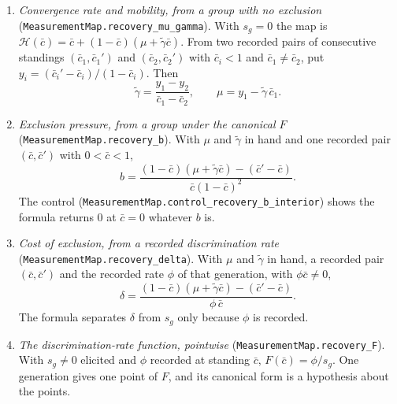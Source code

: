 \documentclass[11pt]{article}
\newcommand{\lean}[1]{\texttt{\footnotesize #1}}
\begin{document}
\begin{enumerate}
\item \emph{Convergence rate and mobility, from a group with no exclusion}
  (\lean{MeasurementMap.recovery\_mu\_gamma}). With $s_g=0$ the map is
  $\mathcal{H}(\bar c)=\bar c+(1-\bar c)(\mu+\tilde\gamma\bar c)$. From two
  recorded pairs of consecutive standings $(\bar c_1,\bar c_1')$ and
  $(\bar c_2,\bar c_2')$ with $\bar c_i<1$ and $\bar c_1\neq\bar c_2$, put
  $y_i=(\bar c_i'-\bar c_i)/(1-\bar c_i)$. Then
  \[
  \tilde\gamma=\frac{y_1-y_2}{\bar c_1-\bar c_2},
  \qquad
  \mu=y_1-\tilde\gamma\,\bar c_1 .
  \]
\item \emph{Exclusion pressure, from a group under the canonical $F$}
  (\lean{MeasurementMap.recovery\_b}). With $\mu$ and $\tilde\gamma$ in hand
  and one recorded pair $(\bar c,\bar c')$ with $0<\bar c<1$,
  \[
  b=\frac{(1-\bar c)(\mu+\tilde\gamma\bar c)-(\bar c'-\bar c)}{\bar c(1-\bar c)^2}.
  \]
  The control (\lean{MeasurementMap.control\_recovery\_b\_interior}) shows the
  formula returns $0$ at $\bar c=0$ whatever $b$ is.
\item \emph{Cost of exclusion, from a recorded discrimination rate}
  (\lean{MeasurementMap.recovery\_delta}). With $\mu$ and $\tilde\gamma$ in
  hand, a recorded pair $(\bar c,\bar c')$ and the recorded rate $\phi$ of that
  generation, with $\phi\bar c\neq0$,
  \[
  \delta=\frac{(1-\bar c)(\mu+\tilde\gamma\bar c)-(\bar c'-\bar c)}{\phi\,\bar c}.
  \]
  The formula separates $\delta$ from $s_g$ only because $\phi$ is recorded.
\item \emph{The discrimination-rate function, pointwise}
  (\lean{MeasurementMap.recovery\_F}). With $s_g\neq0$ elicited and $\phi$
  recorded at standing $\bar c$, $F(\bar c)=\phi/s_g$. One generation gives
  one point of $F$, and its canonical form is a hypothesis about the points.
\end{enumerate}
\end{document}

